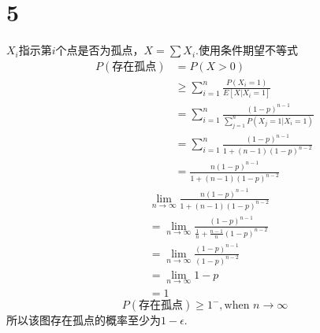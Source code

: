 \documentclass[a4paper,twocolumn]{ctexart}
\begin{document}
\section*{5}
$X_i$指示第$i$个点是否为孤点，$X=\sum X_i$.使用条件期望不等式
\begin{align*}
P(\text{存在孤点})&=P(X>0)\\
&\ge \sum_{i=1}^{n}\frac{P(X_i=1)}{E[X|X_i=1]}\\
&=\sum_{i=1}^{n}\frac{(1-p)^{n-1}}{\sum_{j=1}^{n}P(X_j=1|X_i=1)}\\
&=\sum_{i=1}^{n}\frac{(1-p)^{n-1}}{1+(n-1)(1-p)^{n-2}}\\
&=\frac{n(1-p)^{n-1}}{1+(n-1)(1-p)^{n-2}}
\end{align*}
\begin{align*}
&\lim_{n \to \infty}\frac{n(1-p)^{n-1}}{1+(n-1)(1-p)^{n-2}}\\
&=\lim_{n \to \infty} \frac{(1-p)^{n-1}}{\frac{1}{n}+\frac{n-1}{n}(1-p)^{n-2}}\\
&=\lim_{n \to \infty} \frac{(1-p)^{n-1}}{(1-p)^{n-2}}\\
&=\lim_{n \to \infty} 1-p\\
&=1
\end{align*}
\[
P(\text{存在孤点}) \ge 1^{-} ,\text{when  }n\to \infty
\]
所以该图存在孤点的概率至少为$1-\epsilon$.
\end{document}

